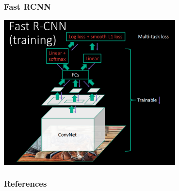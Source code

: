 \documentclass{beamer}
\begin{document}
\begin{frame}
	\frametitle{Fast RCNN}
\begin{center}
	\includegraphics[width=0.7\textwidth]{figs/fast-rcnn.png}
\end{center}
	

\end{frame}



\begin{frame}
    \frametitle{References}
	\nocite{*}    

\printbibliography

\end{frame}
\end{document}
